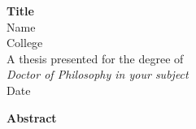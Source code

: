 \thispagestyle{plain}


\begin{center}
    \large
    \textbf{Title} \\ 

    \normalsize
    \vspace{0.4cm}
    Name \\
    College \\
    \smallskip
    A thesis presented for the degree of\\
    \textsl{Doctor of Philosophy in your subject}\\
    \smallskip
    Date

    \vspace{0.8cm}
    \large
    \textbf{Abstract}
\end{center}

\vspace{0.4cm}

\lipsum[1]

